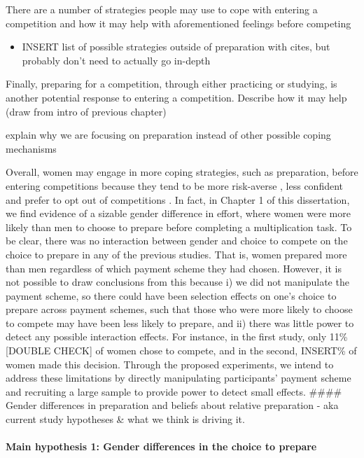 \documentclass[a4paper, nobind]{templates/ociamthesis}
\providecommand{\tightlist}{%
  \setlength{\itemsep}{0pt}\setlength{\parskip}{0pt}}
\begin{document}
There are a number of strategies people may use to cope with entering a competition and how it may help with aforementioned feelings before competing

\begin{itemize}
\tightlist
\item
  INSERT list of possible strategies outside of preparation with cites, but probably don't need to actually go in-depth
\end{itemize}

Finally, preparing for a competition, through either practicing or studying, is another potential response to entering a competition. Describe how it may help (draw from intro of previous chapter)

explain why we are focusing on preparation instead of other possible coping mechanisms

Overall, women may engage in more coping strategies, such as preparation, before entering competitions because they tend to be more risk-averse \autocite{Croson2009,Dohmen2011b,Eckel2008,Bertrand2010a}, less confident \autocite{Bertrand2010,Lundeberg1994,Mobius2011,Barber2001,Croson2009} and prefer to opt out of competitions \autocite{Niederle2011}. In fact, in Chapter 1 of this dissertation, we find evidence of a sizable gender difference in effort, where women were more likely than men to choose to prepare before completing a multiplication task. To be clear, there was no interaction between gender and choice to compete on the choice to prepare in any of the previous studies. That is, women prepared more than men regardless of which payment scheme they had chosen. However, it is not possible to draw conclusions from this because i) we did not manipulate the payment scheme, so there could have been selection effects on one's choice to prepare across payment schemes, such that those who were more likely to choose to compete may have been less likely to prepare, and ii) there was little power to detect any possible interaction effects. For instance, in the first study, only 11\% {[}DOUBLE CHECK{]} of women chose to compete, and in the second, INSERT\% of women made this decision. Through the proposed experiments, we intend to address these limitations by directly manipulating participants' payment scheme and recruiting a large sample to provide power to detect small effects.
\#\#\#\# Gender differences in preparation and beliefs about relative preparation - aka current study hypotheses \& what we think is driving it.

\hypertarget{main-hypothesis-1-gender-differences-in-the-choice-to-prepare}{%
\paragraph{Main hypothesis 1: Gender differences in the choice to prepare}\label{main-hypothesis-1-gender-differences-in-the-choice-to-prepare}}
\end{document}
